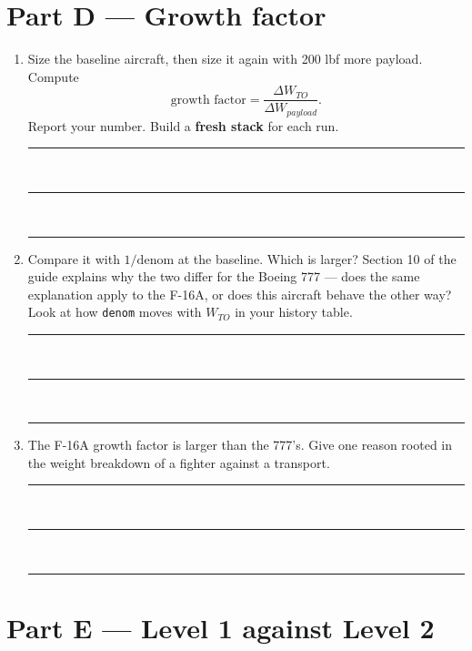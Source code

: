 \documentclass[11pt, a4paper]{article}
\newcommand{\answerspace}[1]{\vspace{#1}\noindent\rule{\linewidth}{0.3pt}\\[2mm]
  \noindent\rule{\linewidth}{0.3pt}\\[2mm]\noindent\rule{\linewidth}{0.3pt}\vspace{3mm}}
\begin{document}
\section*{Part D --- Growth factor}

\begin{enumerate}[leftmargin=*, itemsep=3mm, resume]

\item Size the baseline aircraft, then size it again with 200 lbf more payload.
Compute
\[
\text{growth factor} = \frac{\Delta W_{TO}}{\Delta W_{payload}}.
\]
Report your number. Build a \textbf{fresh stack} for each run.
\answerspace{6mm}

\item Compare it with $1/\mathrm{denom}$ at the baseline. Which is larger?
Section 10 of the guide explains why the two differ for the Boeing 777 --- does
the same explanation apply to the F-16A, or does this aircraft behave the other
way? Look at how \texttt{denom} moves with $W_{TO}$ in your history table.
\answerspace{14mm}

\item The F-16A growth factor is larger than the 777's. Give one reason rooted
in the weight breakdown of a fighter against a transport.
\answerspace{12mm}

\end{enumerate}

\section*{Part E --- Level 1 against Level 2}
\end{document}
